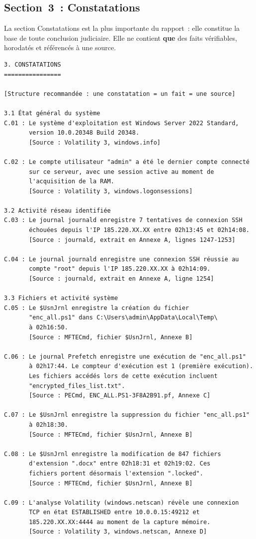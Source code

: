 \subsection{Section~3~: Constatations}

La section Constatations est la plus importante du rapport~: elle
constitue la base de toute conclusion judiciaire. Elle ne contient
\textbf{que} des faits vérifiables, horodatés et référencés à une source.

\begin{lstlisting}[language=bash_forensique,
    caption={Section Constatations --- structure et exemple MVOM}]
3. CONSTATATIONS
================

[Structure recommandée : une constatation = un fait = une source]

3.1 État général du système
C.01 : Le système d'exploitation est Windows Server 2022 Standard,
       version 10.0.20348 Build 20348.
       [Source : Volatility 3, windows.info]

C.02 : Le compte utilisateur "admin" a été le dernier compte connecté
       sur ce serveur, avec une session active au moment de
       l'acquisition de la RAM.
       [Source : Volatility 3, windows.logonsessions]

3.2 Activité réseau identifiée
C.03 : Le journal journald enregistre 7 tentatives de connexion SSH
       échouées depuis l'IP 185.220.XX.XX entre 02h13:45 et 02h14:08.
       [Source : journald, extrait en Annexe A, lignes 1247-1253]

C.04 : Le journal journald enregistre une connexion SSH réussie au
       compte "root" depuis l'IP 185.220.XX.XX à 02h14:09.
       [Source : journald, extrait en Annexe A, ligne 1254]

3.3 Fichiers et activité système
C.05 : Le $UsnJrnl enregistre la création du fichier
       "enc_all.ps1" dans C:\Users\admin\AppData\Local\Temp\
       à 02h16:50.
       [Source : MFTECmd, fichier $UsnJrnl, Annexe B]

C.06 : Le journal Prefetch enregistre une exécution de "enc_all.ps1"
       à 02h17:44. Le compteur d'exécution est 1 (première exécution).
       Les fichiers accédés lors de cette exécution incluent
       "encrypted_files_list.txt".
       [Source : PECmd, ENC_ALL.PS1-3F8A2B91.pf, Annexe C]

C.07 : Le $UsnJrnl enregistre la suppression du fichier "enc_all.ps1"
       à 02h18:30.
       [Source : MFTECmd, fichier $UsnJrnl, Annexe B]

C.08 : Le $UsnJrnl enregistre la modification de 847 fichiers
       d'extension ".docx" entre 02h18:31 et 02h19:02. Ces
       fichiers portent désormais l'extension ".locked".
       [Source : MFTECmd, fichier $UsnJrnl, Annexe B]

C.09 : L'analyse Volatility (windows.netscan) révèle une connexion
       TCP en état ESTABLISHED entre 10.0.0.15:49212 et
       185.220.XX.XX:4444 au moment de la capture mémoire.
       [Source : Volatility 3, windows.netscan, Annexe D]
\end{lstlisting}

